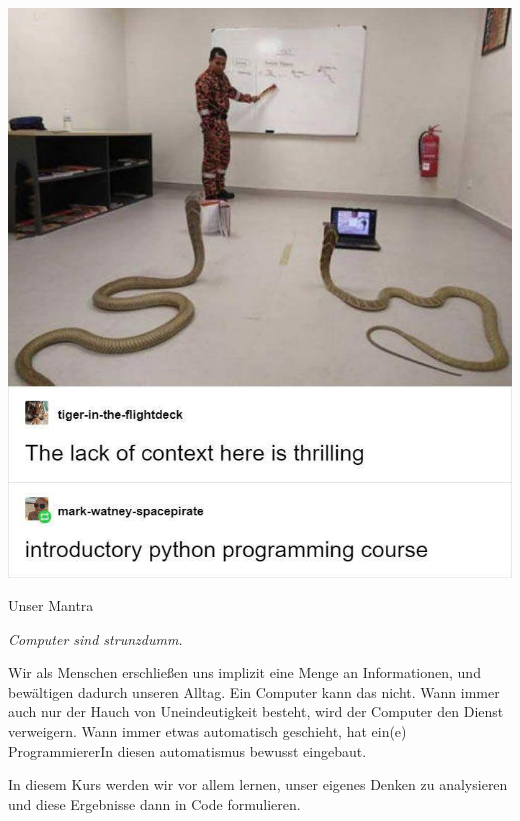 
\begin{frame}[t,plain]
\titlepage
\end{frame}


\begin{frame}
%
\begin{center}
\includegraphics[width=.5\linewidth]{./gfx/intro}
\end{center}
%
\end{frame}


\begin{frame}{Unser Mantra}
%
\begin{center}
\begin{Huge}
\emph{Computer sind strunzdumm.}
\end{Huge}
\vspace{20pt}

Wir als Menschen erschließen uns implizit eine Menge an Informationen, und bewältigen dadurch unseren Alltag. Ein Computer kann das nicht. Wann immer auch nur der Hauch von Uneindeutigkeit besteht, wird der Computer den Dienst verweigern. Wann immer etwas automatisch geschieht, hat ein(e) ProgrammiererIn diesen automatismus bewusst eingebaut.
\vspace{10pt}

In diesem Kurs werden wir vor allem lernen, unser eigenes Denken zu analysieren und diese Ergebnisse dann in Code formulieren.
\end{center}
%
\end{frame}

